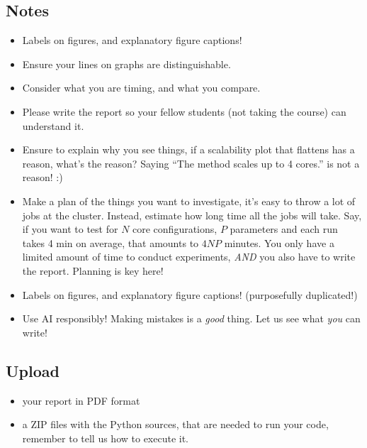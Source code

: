 \documentclass{article}
\begin{document}
\subsection*{Notes}
\begin{itemize}
  \item Labels on figures, and explanatory figure captions!
  \item Ensure your lines on graphs are distinguishable.
  \item Consider what you are timing, and what you compare.
  \item Please write the report so your fellow students (not taking the
    course) can understand it.
  \item Ensure to explain why you see things, if a scalability plot
    that flattens has a reason, what's the reason?
    Saying ``The method scales up to 4 cores.'' is not a reason! :)
  \item Make a plan of the things you want to investigate,
    it's easy to throw a lot of jobs at the cluster. Instead, estimate
    how long time all the jobs will take.
    Say, if you want to test for $N$ core configurations, $P$ parameters
    and each run takes 4 min on average, that amounts to $4 N P$
    minutes. You only have a limited amount of time to conduct experiments,
    \emph{AND} you also have to write the report. Planning is key here!
  \item Labels on figures, and explanatory figure captions! (purposefully duplicated!)

  \item Use AI responsibly! Making mistakes is a \emph{good} thing. Let us see what
    \emph{you} can write!

\end{itemize}

\subsection*{Upload}
\begin{itemize}
  \item your report in PDF format
  \item a ZIP files with the Python sources, that are needed to run your code, remember to
    tell us how to execute it.
\end{itemize}
\end{document}
